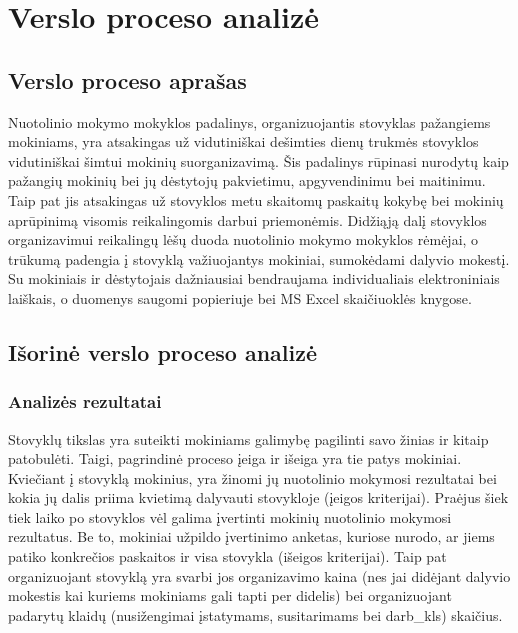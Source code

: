 \chapter{Verslo proceso analizė}

\section{Verslo proceso aprašas}

Nuotolinio mokymo mokyklos padalinys, organizuojantis stovyklas pažangiems
mokiniams, yra atsakingas už vidutiniškai dešimties dienų trukmės
stovyklos vidutiniškai šimtui mokinių suorganizavimą. Šis padalinys
rūpinasi nurodytų kaip pažangių mokinių bei jų dėstytojų pakvietimu, 
apgyvendinimu bei maitinimu. Taip pat jis atsakingas už stovyklos metu 
skaitomų paskaitų kokybę bei mokinių aprūpinimą visomis reikalingomis
darbui priemonėmis. Didžiąją dalį stovyklos organizavimui reikalingų lėšų
duoda nuotolinio mokymo mokyklos rėmėjai, o trūkumą padengia į stovyklą
važiuojantys mokiniai, sumokėdami dalyvio mokestį. Su mokiniais ir
dėstytojais dažniausiai bendraujama individualiais elektroniniais 
laiškais, o duomenys saugomi popieriuje bei MS Excel skaičiuoklės knygose.

\section{Išorinė verslo proceso analizė}

\subsection{Analizės rezultatai}

Stovyklų tikslas yra suteikti mokiniams galimybę pagilinti
savo žinias ir kitaip patobulėti. Taigi, pagrindinė proceso įeiga ir išeiga
yra tie patys mokiniai. Kviečiant į stovyklą mokinius, yra
žinomi jų nuotolinio mokymosi rezultatai bei kokia jų dalis priima 
kvietimą dalyvauti stovykloje (įeigos kriterijai). Praėjus šiek tiek
laiko po stovyklos vėl galima įvertinti mokinių nuotolinio
mokymosi rezultatus. Be to, mokiniai užpildo įvertinimo anketas, kuriose
nurodo, ar jiems patiko konkrečios paskaitos ir visa stovykla
(išeigos kriterijai). Taip pat organizuojant stovyklą yra svarbi jos 
organizavimo kaina (nes jai didėjant dalyvio mokestis kai kuriems 
mokiniams gali tapti per didelis) bei organizuojant padarytų klaidų
(nusižengimai įstatymams, susitarimams bei \glspl{darb_kl}) skaičius. 

